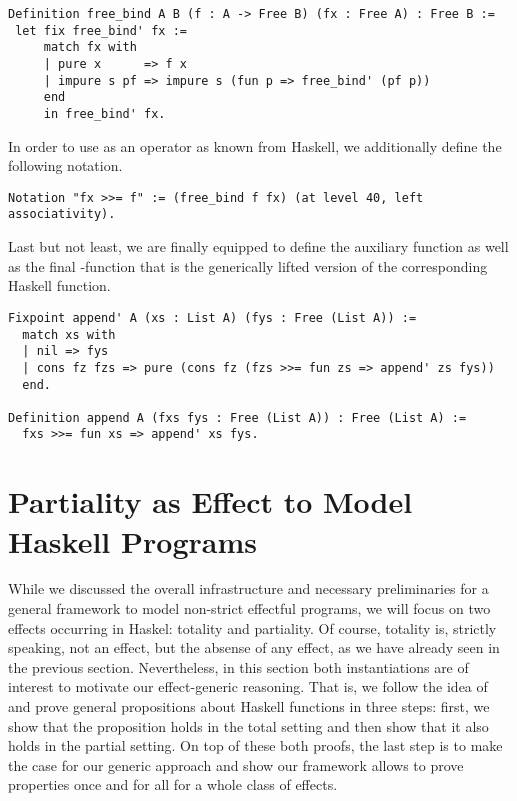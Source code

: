 \begin{verbatim}
Definition free_bind A B (f : A -> Free B) (fx : Free A) : Free B :=
 let fix free_bind' fx :=
     match fx with
     | pure x      => f x
     | impure s pf => impure s (fun p => free_bind' (pf p))
     end
     in free_bind' fx.
\end{verbatim}

In order to use  as an operator \cinl{(>>=)} as known
from Haskell, we additionally define the following notation.

\begin{verbatim}
Notation "fx >>= f" := (free_bind f fx) (at level 40, left associativity).
\end{verbatim}

Last but not least, we are finally equipped to define the auxiliary
function  as well as the final -function
that is the generically lifted version of the corresponding Haskell
function.

\begin{verbatim}
Fixpoint append' A (xs : List A) (fys : Free (List A)) :=
  match xs with
  | nil => fys
  | cons fz fzs => pure (cons fz (fzs >>= fun zs => append' zs fys))
  end.

Definition append A (fxs fys : Free (List A)) : Free (List A) :=
  fxs >>= fun xs => append' xs fys.
\end{verbatim}

\section{Partiality as Effect to Model Haskell Programs}

While we discussed the overall infrastructure and necessary
preliminaries for a general framework to model non-strict effectful
programs, we will focus on two effects occurring in Haskel: totality
and partiality.
Of course, totality is, strictly speaking, not an effect, but the
absense of any effect, as we have already seen in the previous
section.
Nevertheless, in this section both instantiations are of interest to
motivate our effect-generic reasoning.
That is, we follow the idea of \citet{abel2005verifying} and prove
general propositions about Haskell functions in three steps: first, we
show that the proposition holds in the total setting and then show that it
also holds in the partial setting.
On top of these both proofs, the last step is to make the case for our
generic approach and show our framework allows to prove properties
once and for all for a whole class of effects.

